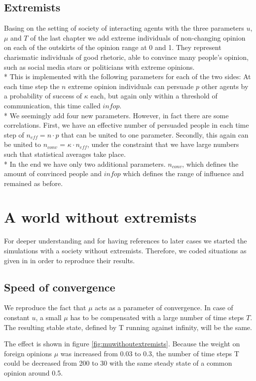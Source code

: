 \documentclass[11pt]{article}
\begin{document}
\subsection{Extremists}
Basing on the setting of society of interacting agents with the three parameters $u$, $\mu$ and $T$ of the last chapter we add extreme individuals of non-changing opinion on each of the outskirts of the opinion range at 0 and 1. They represent charismatic individuals of good rhetoric, able to convince many people's opinion, such as social media stars or politicians with extreme opinions. \\*
This is implemented with the following parameters for each of the two sides: At each time step the $n$ extreme opinion individuals can persuade $p$ other agents by a probability of success of $\kappa$ each, but again only within a threshold of communication, this time called $infop$. \\*
We seemingly add four new parameters. However, in fact there are some correlations.
First, we have an effective number of persuaded people in each time step of $n_{eff} = n \cdot p$ that can be united to one parameter. Secondly, this again can be united to $n_{conv}$ = $\kappa \cdot n_{eff}$, under the constraint that we have large numbers such that statistical averages take place. \\*
In the end we have only two additional parameters. $n_{conv}$, which defines the amount of convinced people and $infop$ which defines the range of influence and remained as before.

\section{A world without extremists}
For deeper understanding and for having references to later cases we started the simulations with a society without extremists. Therefore, we coded situations as given in \cite{Minor} in order to reproduce their results.

\subsection{Speed of convergence}
We reproduce the fact that $\mu$ acts as a parameter of convergence. In case of constant $u$, a small $\mu$ has to be compensated with a large number of time steps $T$. The resulting stable state, defined by T running against infinity, will be the same.

The effect is shown in figure \ref{fig:muwithoutextremists}. Because the weight on foreign opinions $\mu$ was increased from 0.03 to 0.3, the number of time steps T could be decreased from 200 to 30 with the same steady state of a common opinion around 0.5.
\end{document}
